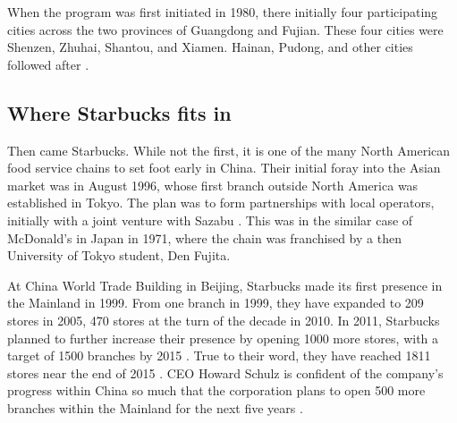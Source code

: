 When the program was first initiated in 1980, there initially four participating
cities across the two provinces of Guangdong and Fujian. These four cities were
Shenzen, Zhuhai, Shantou, and Xiamen. Hainan, Pudong, and other cities followed
after \autocite{jaggi_chinas_1996}. 


\subsection{Where Starbucks fits in}

Then came Starbucks. While not the first, it is one of the many North American
food service chains to set foot early in China. Their initial foray into the Asian
market was in August 1996, whose first branch outside North America was
established in Tokyo. The plan was to form partnerships with local operators,
initially with a joint venture with Sazabu \autocite{harrison_exporting_2005}.
This was in the similar case of McDonald's in Japan in 1971, where the chain was
franchised by a then University of Tokyo student, Den Fujita.
\autocite[21, 113]{watson_golden_2006}

At China World Trade Building in Beijing, Starbucks made its first presence in
the Mainland in 1999. From one branch in 1999, they have expanded to 209 stores
in 2005, 470 stores at the turn of the decade in 2010. In 2011, Starbucks
planned to further increase their presence by opening 1000 more stores, with a
target of 1500 branches by 2015 \autocite{_starbucks_2011}. True to their word,
they have reached 1811 stores near the end of 2015
\autocite{statista_starbucks_2015}. CEO Howard Schulz is confident of the
company's progress within China so much that the corporation plans to open 500
more branches within the Mainland for the next five years
\autocite{burkitt_starbucks_2016}.



